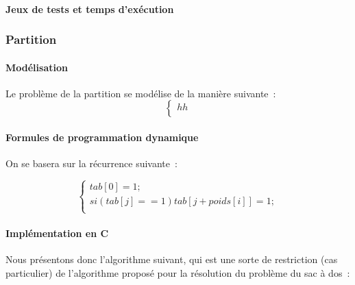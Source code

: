 \documentclass[a4paper, 12pt]{article}
\begin{document}
\paragraph{Jeux de tests et temps d'exécution}

\subsubsection{Partition}

\paragraph{Modélisation}

Le problème de la partition se modélise de la manière suivante~:
\begin{equation}
\begin{cases}

hh \\
\end{cases}
\end{equation}

\paragraph{Formules de programmation dynamique}

On se basera sur la récurrence suivante~:

\begin{equation}
\begin{cases}
tab[0] = 1; \\
si ( tab[j] == 1 ) {
       tab[j + poids[i]] = 1;
     } \\
\end{cases}
\end{equation}

\paragraph{Implémentation en C}

Nous présentons donc l'algorithme suivant, qui est une sorte de
restriction (cas particulier) de l'algorithme proposé pour la
résolution du problème du sac à dos~:
\end{document}
